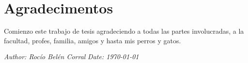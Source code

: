 \chapter*{Agradecimentos}



Comienzo este trabajo de tesis agradeciendo a todas las partes involucradas, a la facultad, profes, familia, amigos y hasta mis perros y gatos.

\textit{Author: Rocío Belén Corral}
\textit{Date: \today}

